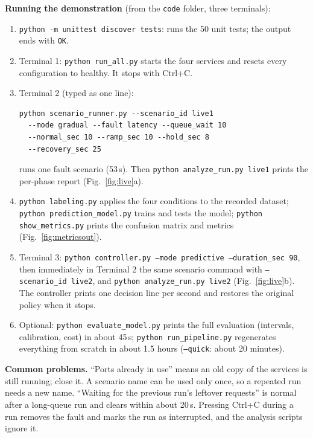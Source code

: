 \documentclass[conference,a4paper]{IEEEtran}
\begin{document}
\textbf{Running the demonstration} (from the \texttt{code} folder, three terminals):\par\raggedright
\begin{enumerate}
\item \texttt{python -m unittest discover tests}: runs the 50 unit tests; the output ends with \texttt{OK}.
\item Terminal 1: \texttt{python run\_all.py} starts the four services and resets every configuration to healthy. It stops with Ctrl+C.
\item Terminal 2 (typed as one line):
\begin{footnotesize}
\begin{verbatim}
python scenario_runner.py --scenario_id live1
  --mode gradual --fault latency --queue_wait 10
  --normal_sec 10 --ramp_sec 10 --hold_sec 8
  --recovery_sec 25
\end{verbatim}
\end{footnotesize}
runs one fault scenario (53\,s). Then \texttt{python analyze\_run.py live1} prints the per-phase report (Fig.~\ref{fig:live}a).
\item \texttt{python labeling.py} applies the four conditions to the recorded dataset; \texttt{python prediction\_model.py} trains and tests the model; \texttt{python show\_metrics.py} prints the confusion matrix and metrics (Fig.~\ref{fig:metricsout}).
\item Terminal 3: \texttt{python controller.py --mode predictive --duration\_sec 90}, then immediately in Terminal 2 the same scenario command with \texttt{--scenario\_id live2}, and \texttt{python analyze\_run.py live2} (Fig.~\ref{fig:live}b). The controller prints one decision line per second and restores the original policy when it stops.
\item Optional: \texttt{python evaluate\_model.py} prints the full evaluation (intervals, calibration, cost) in about 45\,s; \texttt{python run\_pipeline.py} regenerates everything from scratch in about 1.5 hours (\texttt{--quick}: about 20 minutes).
\end{enumerate}

\textbf{Common problems.} ``Ports already in use'' means an old copy of the services is still running; close it. A scenario name can be used only once, so a repeated run needs a new name. ``Waiting for the previous run's leftover requests'' is normal after a long-queue run and clears within about 20\,s. Pressing Ctrl+C during a run removes the fault and marks the run as interrupted, and the analysis scripts ignore it.
\end{document}

